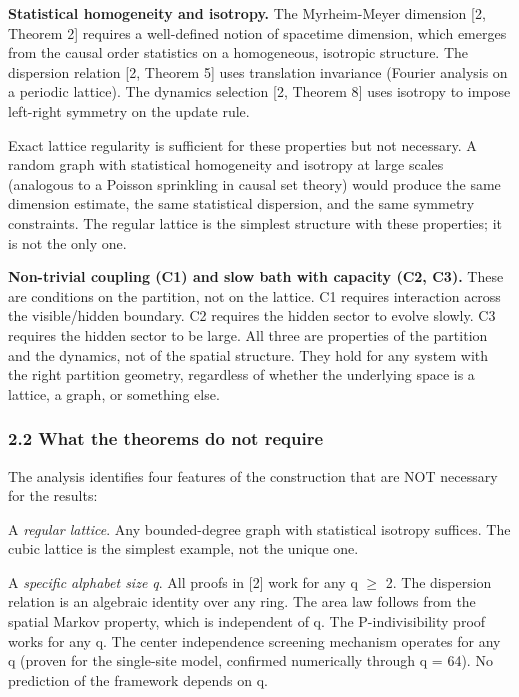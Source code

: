 \documentclass[
  11pt,
]{article}
\begin{document}
\textbf{Statistical homogeneity and isotropy.} The Myrheim-Meyer
dimension {[}2, Theorem 2{]} requires a well-defined notion of spacetime
dimension, which emerges from the causal order statistics on a
homogeneous, isotropic structure. The dispersion relation {[}2, Theorem
5{]} uses translation invariance (Fourier analysis on a periodic
lattice). The dynamics selection {[}2, Theorem 8{]} uses isotropy to
impose left-right symmetry on the update rule.

Exact lattice regularity is sufficient for these properties but not
necessary. A random graph with statistical homogeneity and isotropy at
large scales (analogous to a Poisson sprinkling in causal set theory)
would produce the same dimension estimate, the same statistical
dispersion, and the same symmetry constraints. The regular lattice is
the simplest structure with these properties; it is not the only one.

\textbf{Non-trivial coupling (C1) and slow bath with capacity (C2, C3).}
These are conditions on the partition, not on the lattice. C1 requires
interaction across the visible/hidden boundary. C2 requires the hidden
sector to evolve slowly. C3 requires the hidden sector to be large. All
three are properties of the partition and the dynamics, not of the
spatial structure. They hold for any system with the right partition
geometry, regardless of whether the underlying space is a lattice, a
graph, or something else.

\hypertarget{what-the-theorems-do-not-require}{%
\subsubsection{2.2 What the theorems do not
require}\label{what-the-theorems-do-not-require}}

The analysis identifies four features of the construction that are NOT
necessary for the results:

A \emph{regular lattice}. Any bounded-degree graph with statistical
isotropy suffices. The cubic lattice is the simplest example, not the
unique one.

A \emph{specific alphabet size q}. All proofs in {[}2{]} work for any q
\ensuremath{\geq} 2. The dispersion relation is an algebraic identity over any ring. The
area law follows from the spatial Markov property, which is independent
of q. The P-indivisibility proof works for any q. The center
independence screening mechanism operates for any q (proven for the
single-site model, confirmed numerically through q = 64). No prediction
of the framework depends on q.
\end{document}
